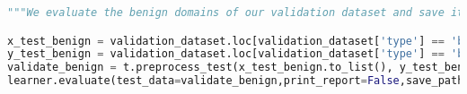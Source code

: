 \begin{lstlisting}[language=Python]
"""We evaluate the benign domains of our validation dataset and save it as well."""

x_test_benign = validation_dataset.loc[validation_dataset['type'] == 'benign'].iloc[:,0]
y_test_benign = validation_dataset.loc[validation_dataset['type'] == 'benign'].iloc[:,2]
validate_benign = t.preprocess_test(x_test_benign.to_list(), y_test_benign.to_list())
learner.evaluate(test_data=validate_benign,print_report=False,save_path='/content/drive/MyDrive/research/classifaction_benign.csv')
\end{lstlisting}

% 